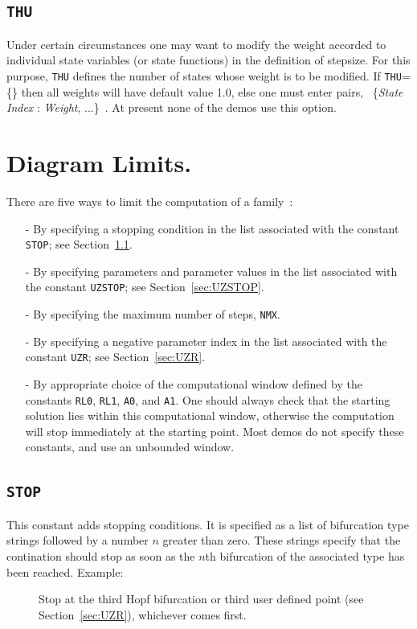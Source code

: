 \documentclass[12pt]{report}
\begin{document}
\subsection{\texttt{THU}}  \label{sec:THU}
Under certain circumstances one may want to modify the weight accorded 
to individual state variables (or state functions) in the definition 
of stepsize.
For this purpose, {\tt THU} defines the number of states whose weight 
is to be modified.
If {\tt THU}=\{\} then all weights will have default value 1.0,
else one must enter pairs,
             ~\{{\it State Index} : {\it Weight}, ...\}~.
At present none of the demos use this option.
\section{ Diagram Limits.} \label{sec:Diagram_limits}

There are five ways to limit the computation of a family~:

\begin{itemize}
\item[-]
By specifying a stopping condition in the list associated 
with the constant {\tt STOP}; see Section~\ref{sec:STOP}. 

\item[-]
By specifying parameters and parameter values in the list associated 
with the constant {\tt UZSTOP}; see Section~\ref{sec:UZSTOP}.

\item[-]
By specifying the maximum number of steps, {\tt NMX}.

\item[-]
By specifying a negative parameter index in the list associated 
with the constant {\tt UZR}; see Section~\ref{sec:UZR}. 

\item[-]
By appropriate choice of the computational window 
defined by the constants {\tt RL0}, {\tt RL1}, {\tt A0}, and {\tt A1}.
One should always check that the starting solution lies within
this computational window, otherwise the computation will stop immediately
at the starting point. Most demos do not specify these constants, and
use an unbounded window.
\end{itemize}

\subsection{\texttt{STOP}}  \label{sec:STOP}
This constant adds stopping conditions. It is specified as a list of
bifurcation type strings followed by a number $n$ greater than zero.
These strings specify that the contination should stop as soon as the $n$th
bifurcation of the associated type has been reached.
Example:\\
\begin{description}
\item[]
Stop at the third Hopf bifurcation or third user defined point (see
Section~\ref{sec:UZR}), whichever comes first.
\end{description}
\end{document}
